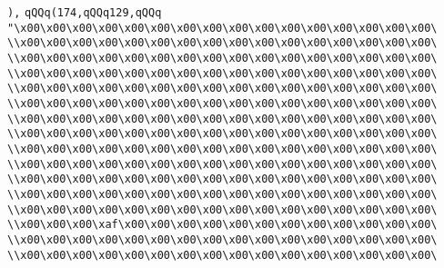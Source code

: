 \verb|),|\newline
\verb|qQQq(174,qQQq129,qQQq|\newline
\verb|"\x00\x00\x00\x00\x00\x00\x00\x00\x00\x00\x00\x00\x00\x00\x00\x00\|\newline
\verb|\\x00\x00\x00\x00\x00\x00\x00\x00\x00\x00\x00\x00\x00\x00\x00\x00\|\newline
\verb|\\x00\x00\x00\x00\x00\x00\x00\x00\x00\x00\x00\x00\x00\x00\x00\x00\|\newline
\verb|\\x00\x00\x00\x00\x00\x00\x00\x00\x00\x00\x00\x00\x00\x00\x00\x00\|\newline
\verb|\\x00\x00\x00\x00\x00\x00\x00\x00\x00\x00\x00\x00\x00\x00\x00\x00\|\newline
\verb|\\x00\x00\x00\x00\x00\x00\x00\x00\x00\x00\x00\x00\x00\x00\x00\x00\|\newline
\verb|\\x00\x00\x00\x00\x00\x00\x00\x00\x00\x00\x00\x00\x00\x00\x00\x00\|\newline
\verb|\\x00\x00\x00\x00\x00\x00\x00\x00\x00\x00\x00\x00\x00\x00\x00\x00\|\newline
\verb|\\x00\x00\x00\x00\x00\x00\x00\x00\x00\x00\x00\x00\x00\x00\x00\x00\|\newline
\verb|\\x00\x00\x00\x00\x00\x00\x00\x00\x00\x00\x00\x00\x00\x00\x00\x00\|\newline
\verb|\\x00\x00\x00\x00\x00\x00\x00\x00\x00\x00\x00\x00\x00\x00\x00\x00\|\newline
\verb|\\x00\x00\x00\x00\x00\x00\x00\x00\x00\x00\x00\x00\x00\x00\x00\x00\|\newline
\verb|\\x00\x00\x00\x00\x00\x00\x00\x00\x00\x00\x00\x00\x00\x00\x00\x00\|\newline
\verb|\\x00\x00\x00\xaf\x00\x00\x00\x00\x00\x00\x00\x00\x00\x00\x00\x00\|\newline
\verb|\\x00\x00\x00\x00\x00\x00\x00\x00\x00\x00\x00\x00\x00\x00\x00\x00\|\newline
\verb|\\x00\x00\x00\x00\x00\x00\x00\x00\x00\x00\x00\x00\x00\x00\x00\x00\|\newline
